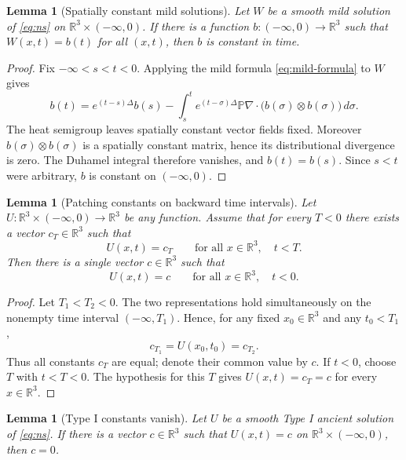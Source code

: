 \documentclass[11pt]{amsart}
\theoremstyle{plain}
\newtheorem{lemma}[theorem]{Lemma}
\theoremstyle{definition}
\theoremstyle{remark}
\numberwithin{equation}{section}
\begin{document}
\begin{lemma}[Spatially constant mild solutions]\label{lem:spatial-constant-mild}
Let \(W\) be a smooth mild solution of \eqref{eq:ns} on
\(\mathbb R^3\times(-\infty,0)\).  If there is a function
\(b:(-\infty,0)\to\mathbb R^3\) such that \(W(x,t)=b(t)\) for all
\((x,t)\), then \(b\) is constant in time.
\end{lemma}

\begin{proof}
Fix \(-\infty<s<t<0\).  Applying the mild formula \eqref{eq:mild-formula} to
\(W\) gives
\[
   b(t)=e^{(t-s)\Delta}b(s)
   -\int_s^t e^{(t-\sigma)\Delta}\mathbb P\nabla\cdot
      \bigl(b(\sigma)\otimes b(\sigma)\bigr)\,d\sigma .
\]
The heat semigroup leaves spatially constant vector fields fixed.  Moreover
\(b(\sigma)\otimes b(\sigma)\) is a spatially constant matrix, hence its
distributional divergence is zero.  The Duhamel integral therefore vanishes,
and \(b(t)=b(s)\).  Since \(s<t\) were arbitrary, \(b\) is constant on
\((-\infty,0)\).
\end{proof}

\begin{lemma}[Patching constants on backward time intervals]
\label{lem:patch-constants}
Let \(U:\mathbb R^3\times(-\infty,0)\to\mathbb R^3\) be any function.  Assume
that for every \(T<0\) there exists a vector \(c_T\in\mathbb R^3\) such that
\[
   U(x,t)=c_T
   \qquad\text{for all }x\in\mathbb R^3,\quad t<T .
\]
Then there is a single vector \(c\in\mathbb R^3\) such that
\[
   U(x,t)=c
   \qquad\text{for all }x\in\mathbb R^3,\quad t<0 .
\]
\end{lemma}

\begin{proof}
Let \(T_1<T_2<0\).  The two representations hold simultaneously on the
nonempty time interval \((-\infty,T_1)\).  Hence, for any fixed
\(x_0\in\mathbb R^3\) and any \(t_0<T_1\),
\[
   c_{T_1}=U(x_0,t_0)=c_{T_2}.
\]
Thus all constants \(c_T\) are equal; denote their common value by \(c\).  If
\(t<0\), choose \(T\) with \(t<T<0\).  The hypothesis for this \(T\) gives
\(U(x,t)=c_T=c\) for every \(x\in\mathbb R^3\).
\end{proof}

\begin{lemma}[Type I constants vanish]\label{lem:type-i-constant}
Let \(U\) be a smooth Type I ancient solution of \eqref{eq:ns}.  If there is a
vector \(c\in\mathbb R^3\) such that \(U(x,t)=c\) on
\(\mathbb R^3\times(-\infty,0)\), then \(c=0\).
\end{lemma}
\end{document}
